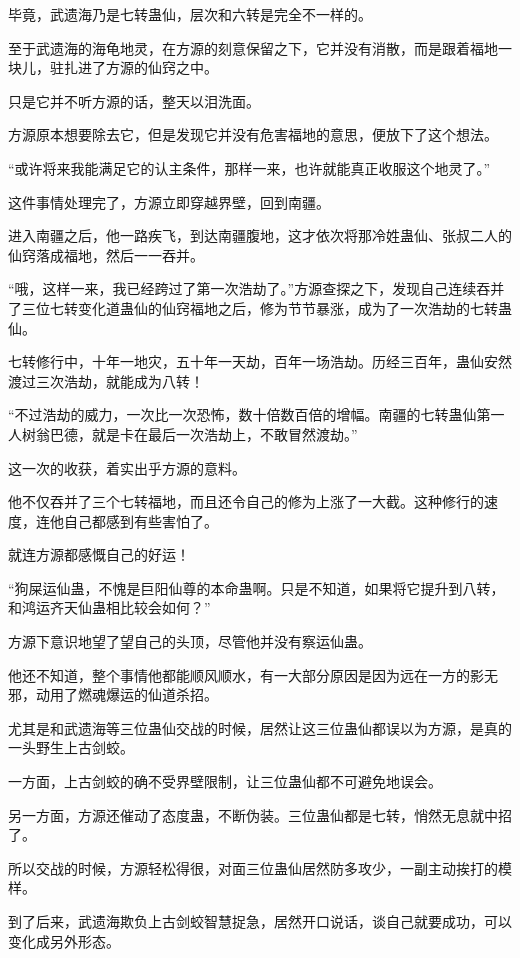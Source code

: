 \begin{this_body}
毕竟，武遗海乃是七转蛊仙，层次和六转是完全不一样的。

至于武遗海的海龟地灵，在方源的刻意保留之下，它并没有消散，而是跟着福地一块儿，驻扎进了方源的仙窍之中。

只是它并不听方源的话，整天以泪洗面。

方源原本想要除去它，但是发现它并没有危害福地的意思，便放下了这个想法。

“或许将来我能满足它的认主条件，那样一来，也许就能真正收服这个地灵了。”

这件事情处理完了，方源立即穿越界壁，回到南疆。

进入南疆之后，他一路疾飞，到达南疆腹地，这才依次将那冷姓蛊仙、张叔二人的仙窍落成福地，然后一一吞并。

“哦，这样一来，我已经跨过了第一次浩劫了。”方源查探之下，发现自己连续吞并了三位七转变化道蛊仙的仙窍福地之后，修为节节暴涨，成为了一次浩劫的七转蛊仙。

七转修行中，十年一地灾，五十年一天劫，百年一场浩劫。历经三百年，蛊仙安然渡过三次浩劫，就能成为八转！

“不过浩劫的威力，一次比一次恐怖，数十倍数百倍的增幅。南疆的七转蛊仙第一人树翁巴德，就是卡在最后一次浩劫上，不敢冒然渡劫。”

这一次的收获，着实出乎方源的意料。

他不仅吞并了三个七转福地，而且还令自己的修为上涨了一大截。这种修行的速度，连他自己都感到有些害怕了。

就连方源都感慨自己的好运！

“狗屎运仙蛊，不愧是巨阳仙尊的本命蛊啊。只是不知道，如果将它提升到八转，和鸿运齐天仙蛊相比较会如何？”

方源下意识地望了望自己的头顶，尽管他并没有察运仙蛊。

他还不知道，整个事情他都能顺风顺水，有一大部分原因是因为远在一方的影无邪，动用了燃魂爆运的仙道杀招。

尤其是和武遗海等三位蛊仙交战的时候，居然让这三位蛊仙都误以为方源，是真的一头野生上古剑蛟。

一方面，上古剑蛟的确不受界壁限制，让三位蛊仙都不可避免地误会。

另一方面，方源还催动了态度蛊，不断伪装。三位蛊仙都是七转，悄然无息就中招了。

所以交战的时候，方源轻松得很，对面三位蛊仙居然防多攻少，一副主动挨打的模样。

到了后来，武遗海欺负上古剑蛟智慧捉急，居然开口说话，谈自己就要成功，可以变化成另外形态。


\end{this_body}
